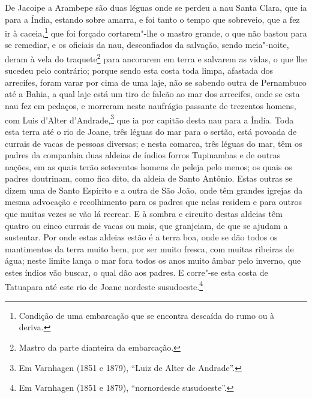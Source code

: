 De Jacoipe a Arambepe são duas léguas onde se perdeu a nau Santa Clara, que ia para a
Índia, estando sobre amarra, e foi tanto o tempo que sobreveio, que a fez ir à
caceia,\footnote{ Condição de uma embarcação que se encontra descaída do rumo ou à
deriva.} que foi forçado cortarem"-lhe o mastro grande, o que não bastou para se remediar,
e os oficiais da nau, desconfiados da salvação, sendo meia"-noite, deram à vela do
traquete\footnote{ Mastro da parte dianteira da embarcação.} para
ancorarem em terra e salvarem as vidas, o que lhe sucedeu pelo contrário; porque sendo
esta costa toda limpa, afastada dos arrecifes, foram varar por cima de uma laje, não se
sabendo outra de Pernambuco até a Bahia, a qual laje está um tiro de falcão ao mar dos
arrecifes, onde se esta nau fez em pedaços, e morreram neste naufrágio passante
de  trezentos homens, com Luis d'Alter d'Andrade,\footnote{ Em Varnhagen (1851 e
1879), ``Luiz de Alter de Andrade''.} que ia por capitão desta nau para a Índia. Toda esta
terra até o rio de Joane, três léguas do mar para o sertão, está povoada de currais de
vacas de pessoas diversas; e nesta comarca, três léguas do mar, têm os padres da companhia
duas aldeias de índios forros Tupinambas e de outras nações, em as quais terão setecentos
homens de peleja pelo menos; os quais os padres doutrinam, como fica dito, da aldeia de
Santo Antônio. Estas outras se dizem uma de Santo Espírito e a outra de São João, onde têm
grandes igrejas da mesma advocação e recolhimento para os padres que nelas residem e para
outros que muitas vezes se vão lá recrear. E à sombra e circuito destas aldeias têm quatro
ou cinco currais de vacas ou mais, que granjeiam, de que se ajudam a sustentar. Por onde
estas aldeias estão é a terra boa, onde se dão todos os mantimentos da terra muito bem,
por ser muito fresca, com muitas ribeiras de água; neste limite lança o mar fora todos os
anos muito âmbar pelo inverno, que estes índios vão buscar, o qual dão aos padres. E
corre"-se esta costa de Tatuapara até este rio de Joane nordeste susudoeste.\footnote{ Em
Varnhagen (1851 e 1879), ``nornordesde susudoeste''.}

